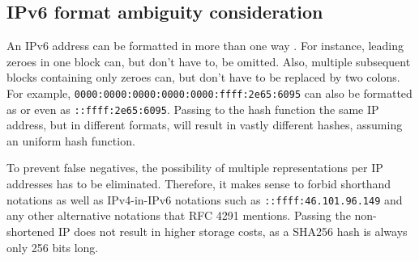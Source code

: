 

\subsection{IPv6 format ambiguity consideration}

An IPv6 address can be formatted in more than one way \cite{RFC4291I66}. For instance, leading zeroes in one block can, but don't have to, be omitted. Also, multiple subsequent blocks containing only zeroes can, but don't have to be replaced by two colons.
For example, \texttt{0000:0000:0000:0000:0000:ffff:2e65:6095} can also be formatted as
 or even as \texttt{::ffff:2e65:6095}. Passing to the hash function the same IP address, but in different formats, will result in vastly different hashes, assuming an uniform hash function.

To prevent false negatives, the possibility of multiple representations per IP addresses has to be eliminated. Therefore, it makes sense to forbid shorthand notations as well as IPv4-in-IPv6 notations such as \texttt{::ffff:46.101.96.149} and any other alternative notations that RFC 4291 \cite{RFC4291I66} mentions.
Passing the non-shortened IP does not result in higher storage costs, as a SHA256 hash is always only 256 bits long.

